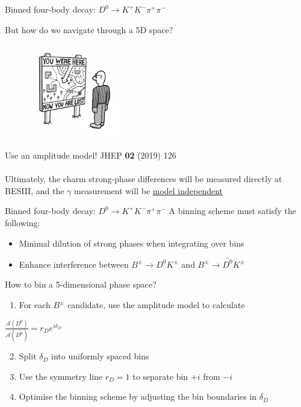 \documentclass[dvipsnames]{beamer}
\begin{document}
\begin{frame}{Binned four-body decay: $D^0\to K^+K^-\pi^+\pi^-$}
  \begin{center}
    \Large But how do we navigate through a 5D space?
  \end{center}
  \vspace{-0.5cm}
  \begin{figure}
    \centering
    \includegraphics[width = 0.35\textwidth]{Plots/TravelLost.jpeg}
  \end{figure}
  \vspace{-0.7cm}
  \begin{center}
    \Large Use an amplitude model! JHEP \textbf{02} (2019) 126\\~\\
    \large Ultimately, the charm strong-phase differences will be measured directly at BESIII, and the $\gamma$ measurement will be \underline{model independent}
  \end{center}
\end{frame}

\begin{frame}{Binned four-body decay: $D^0\to K^+K^-\pi^+\pi^-$}
  \vspace{0.0cm}
  {\Large A binning scheme must satisfy the following:}
  \begin{itemize}
    \item{Minimal dilution of strong phases when integrating over bins}
    \item{Enhance interference between $B^\pm\to D^0K^\pm$ and $B^\pm\to\bar{D^0}K^\pm$}
  \end{itemize}
  \vspace{0.4cm}
  {\Large How to bin a 5-dimensional phase space?}
  \begin{enumerate}
    \item{For each $B^\pm$ candidate, use the amplitude model to calculate}
  \end{enumerate}
  \begin{center}
    {\Large $\frac{\mathcal{A}(D^0)}{\mathcal{A}(\bar{D^0})} = r_De^{i\delta_D}$}
  \end{center}
  \begin{enumerate}
    \setcounter{enumi}{1}
    \setlength\itemsep{0.5em}
    \item{Split $\delta_D$ into uniformly spaced bins}
    \item{Use the symmetry line $r_D = 1$ to separate bin $+i$ from $-i$}
    \item{Optimise the binning scheme by adjusting the bin boundaries in $\delta_D$}
  \end{enumerate}
\end{frame}
\end{document}
